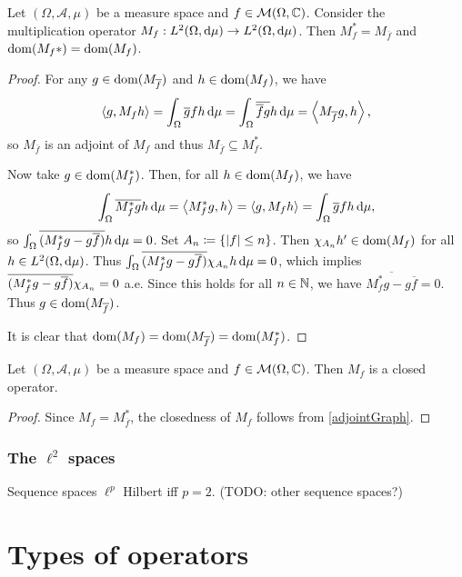 \begin{proposition}
Let $(\Omega, \mathcal{A}, \mu)$ be a measure space and $f\in \operatorname{\mathcal{M}}(\Omega, \mathbb{C})$. Consider the multiplication operator $M_f: L^2(\Omega,\operatorname{d \!}\mu)\to L^2(\Omega,\operatorname{d \!}\mu)$. Then $M_f^* = M_{\overline{f}}$ and $\operatorname{dom}(M_f*) = \operatorname{dom}(M_f)$.
\end{proposition}
\begin{proof}
For any $g\in \operatorname{dom}(M_{\overline{f}})$ and $h\in \operatorname{dom}(M_f)$, we have
\[ \left\langle g, M_fh \right\rangle = \int_\Omega \overline{g}fh \operatorname{d \!}\mu = \int_\Omega \overline{\overline{f}g}h \operatorname{d \!}\mu = \left\langle M_{\overline{f}}g, h \right\rangle, \]
so $M_{\overline{f}}$ is an adjoint of $M_f$ and thus $M_{\overline{f}}\subseteq M_f^*$.

Now take $g\in \operatorname{dom}(M_f^*)$. Then, for all $h\in \operatorname{dom}(M_f)$, we have
\[ \int_\Omega \overline{M_f^*g}h \operatorname{d \!}\mu = \left\langle M_f^*g,h \right\rangle = \left\langle g,M_f h \right\rangle = \int_\Omega \overline{g}fh\operatorname{d \!}\mu, \]
so $\int_\Omega \overline{(M_f^*g - g\overline{f})}h\operatorname{d \!}\mu = 0$. Set $A_n \coloneqq \{|f| \leq n\}$. Then $\chi_{A_n}h'\in \operatorname{dom}(M_f)$ for all $h\in L^2(\Omega,\operatorname{d \!}\mu)$. Thus $\int_\Omega \overline{(M_f^*g - g\overline{f})}\chi_{A_n}h\operatorname{d \!}\mu = 0$, which implies $\overline{(M_f^*g - g\overline{f})}\chi_{A_n} = 0$ a.e. Since this holds for all $n\in \mathbb{N}$, we have $\overline{M_f^*g - g\overline{f}} = 0$. Thus $g\in \operatorname{dom}(M_{\overline{f}})$.

It is clear that $\operatorname{dom}(M_f) = \operatorname{dom}(M_{\overline{f}}) = \operatorname{dom}(M_f^*)$.
\end{proof}
\begin{corollary}
Let $(\Omega, \mathcal{A}, \mu)$ be a measure space and $f\in \operatorname{\mathcal{M}}(\Omega, \mathbb{C})$. Then $M_f$ is a closed operator.
\end{corollary}
\begin{proof}
Since $M_{f} = M_{\overline{f}}^*$, the closedness of $M_f$ follows from \ref{adjointGraph}.
\end{proof}

\subsection{The $\ell^2$ spaces}
Sequence spaces $\ell^p$ Hilbert iff $p=2$. (TODO: other sequence spaces?)

\chapter{Types of operators}

